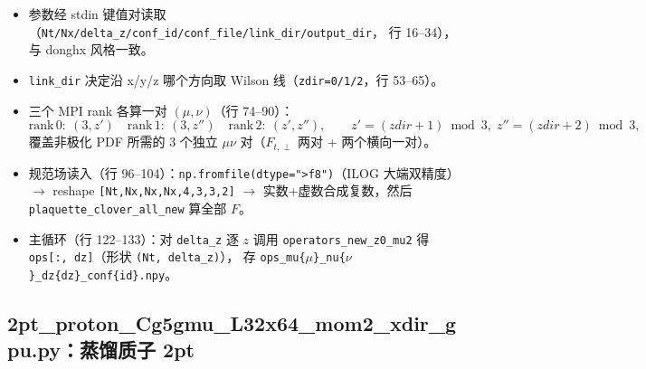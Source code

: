 \documentclass[UTF8,11pt]{ctexart}
\begin{document}
\begin{itemize}
  \item 参数经 stdin 键值对读取（\texttt{Nt/Nx/delta\_z/conf\_id/conf\_file/link\_dir/output\_dir}，
  行 16--34），与 donghx 风格一致。
  \item \texttt{link\_dir} 决定沿 x/y/z 哪个方向取 Wilson 线（\texttt{zdir=0/1/2}，行 53--65）。
  \item 三个 MPI rank 各算一对 $(\mu,\nu)$（行 74--90）：
  \begin{equation*}
    \mathrm{rank}\,0:\ (3, z')\quad
    \mathrm{rank}\,1:\ (3, z'')\quad
    \mathrm{rank}\,2:\ (z', z''),
    \qquad z'=(zdir{+}1)\bmod 3,\; z''=(zdir{+}2)\bmod 3,
  \end{equation*}
  覆盖非极化 PDF 所需的 3 个独立 $\mu\nu$ 对（$F_{t,\perp}$ 两对 + 两个横向一对）。
  \item 规范场读入（行 96--104）：\texttt{np.fromfile(dtype=">f8")}（ILOG 大端双精度）
  $\to$ reshape \texttt{[Nt,Nx,Nx,Nx,4,3,3,2]} $\to$ 实数+虚数合成复数，然后
  \texttt{plaquette\_clover\_all\_new} 算全部 $F$。
  \item 主循环（行 122--133）：对 \texttt{delta\_z} 逐 $z$ 调用 \texttt{operators\_new\_z0\_mu2}
  得 \texttt{ops[:, dz]}（形状 \texttt{(Nt, delta\_z)}），
  存 \texttt{ops\_mu\{$\mu$\}\_nu\{$\nu$\}\_dz\{dz\}\_conf\{id\}.npy}。
\end{itemize}

\subsection{2pt\_proton\_Cg5gmu\_L32x64\_mom2\_xdir\_gpu.py：蒸馏质子 2pt}
\label{sec:2pt_script}
\end{document}
